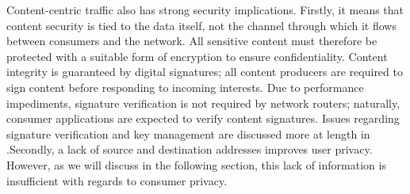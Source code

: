 Content-centric traffic also has strong security implications. Firstly, it means that content security is tied to the data itself, not the channel through which it flows between consumers and the network. All sensitive content must therefore be protected with a suitable form of encryption to ensure confidentiality. Content integrity is guaranteed by digital signatures; all content producers are required to sign content before responding to incoming interests. Due to performance impediments, signature verification is not required by network routers; naturally, consumer applications are expected to verify content signatures. Issues regarding signature verification and key management are discussed more at length in \cite{}.Secondly, a lack of source and destination addresses improves user privacy. However, as we will discuss in the following section, this lack of information is insufficient with regards to consumer privacy. 

